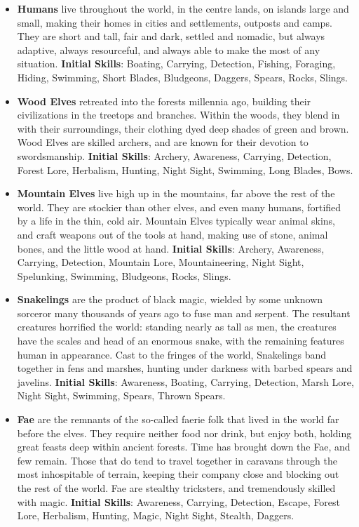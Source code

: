 \begin{itemize}
\item {\bf Humans} live throughout the world, in the centre lands, on
islands large and small, making their homes in cities and settlements, 
outposts and camps.  They are short and tall, fair and dark, settled and 
nomadic, but always adaptive, always resourceful, and always able to make 
the most of any situation. \textbf{Initial Skills}: Boating, Carrying,
Detection, Fishing, Foraging, Hiding, Swimming, Short Blades, Bludgeons,
Daggers, Spears, Rocks, Slings.

\item {\bf Wood Elves} retreated into the forests millennia ago, building 
their civilizations in the treetops and branches.  Within the woods, they 
blend in with their surroundings, their clothing dyed deep shades of green 
and brown.  Wood Elves are skilled archers, and are known for their 
devotion to swordsmanship. \textbf{Initial Skills}: Archery, Awareness,
Carrying, Detection, Forest Lore, Herbalism, Hunting, Night Sight, Swimming,
Long Blades, Bows.

\item {\bf Mountain Elves} live high up in the mountains, far above the 
rest of the world.  They are stockier than other elves, and even many 
humans, fortified by a life in the thin, cold air.  Mountain Elves 
typically wear animal skins, and craft weapons out of the tools at hand, 
making use of stone, animal bones, and the little wood at hand.
\textbf{Initial Skills}: Archery, Awareness, Carrying, Detection, 
Mountain Lore, Mountaineering, Night Sight, Spelunking, Swimming,
Bludgeons, Rocks, Slings.

\item {\bf Snakelings} are the product of black magic, wielded by some
unknown sorceror many thousands of years ago to fuse man and serpent. 
The resultant creatures horrified the world: standing nearly as tall as men,
the creatures have the scales and head of an enormous snake, with the 
remaining features human in appearance.  Cast to the fringes of the world, 
Snakelings band together in fens and marshes, hunting under darkness with 
barbed spears and javelins.  \textbf{Initial Skills}: Awareness, Boating,
Carrying, Detection, Marsh Lore, Night Sight, Swimming, Spears, Thrown
Spears.

\item {\bf Fae} are the remnants of the so-called faerie folk that lived in
the world far before the elves.  They require neither food nor drink, but 
enjoy both, holding great feasts deep within ancient forests.  Time has 
brought down the Fae, and few remain.  Those that do tend to travel 
together in caravans through the most inhospitable of terrain, keeping 
their company close and blocking out the rest of the world.  Fae are 
stealthy tricksters, and tremendously skilled with magic. 
\textbf{Initial Skills}: Awareness, Carrying, Detection, Escape, Forest
Lore, Herbalism, Hunting, Magic, Night Sight, Stealth, Daggers.


\end{itemize}
